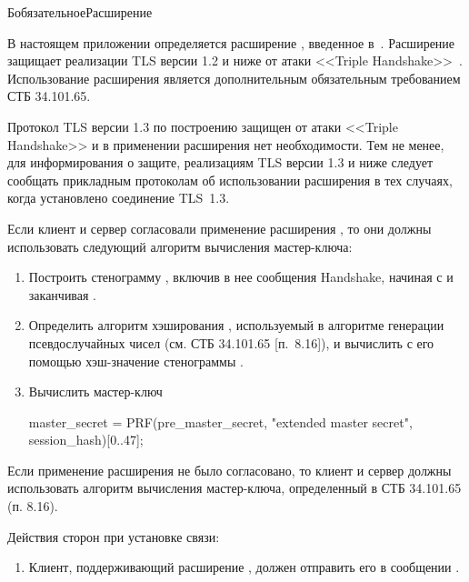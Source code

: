 \begin{appendix}{Б}{обязательное}{Расширение }
\label{EMS} 

\label{EMS.Intro}

В настоящем приложении определяется расширение ,
введенное в~\cite{RFC7627}. Расширение защищает реализации TLS версии 1.2 и 
ниже от атаки <<Triple Handshake>>~\cite{Triple}.
%
Использование расширения  является дополнительным 
обязательным требованием СТБ 34.101.65.

Протокол TLS версии 1.3 по построению защищен от атаки <<Triple Handshake>>
и в применении расширения  нет необходимости.
%
Тем не менее, для информирования о защите, реализациям TLS версии 
1.3 и ниже следует сообщать прикладным протоколам об использовании расширения 
в тех случаях, когда установлено соединение TLS~1.3.

\label{TLS12.MS}

Если клиент и сервер согласовали применение расширения
, то они должны использовать следующий алгоритм
вычисления мастер-ключа:
%
\begin{enumerate}
\item
Построить стенограмму , включив в нее сообщения
Handshake, начиная с  и заканчивая .
\item
Определить алгоритм хэширования , используемый в алгоритме генерации 
псевдослучайных чисел (см. СТБ 34.101.65 [п.~8.16]), и вычислить с его помощью 
хэш-значение 
стенограммы .
\item
Вычислить мастер-ключ
\begin{codeblock}
master_secret = PRF(pre_master_secret, 
  "extended master secret", session_hash)[0..47];
\end{codeblock}
\end{enumerate}

Если применение расширения  не было согласовано,
то клиент и сервер должны использовать алгоритм вычисления мастер-ключа, 
определенный в СТБ 34.101.65 (п. 8.16).

\label{EMS.FullHS}

Действия сторон при установке связи:
\begin{enumerate}
\item
Клиент, поддерживающий  расширение ,
должен отправить его в сообщении .


\end{enumerate}
\end{appendix}
